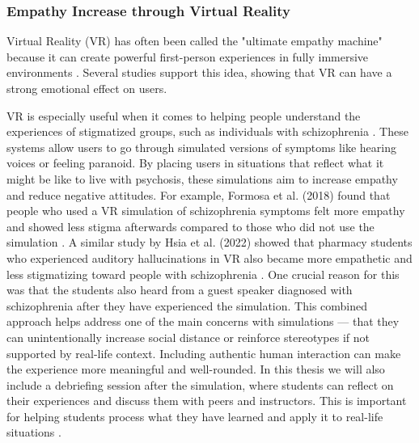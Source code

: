 \subsubsection{Empathy Increase through Virtual Reality}

Virtual Reality (VR) has often been called the "ultimate empathy machine" because it can create powerful first-person experiences in fully immersive environments \cite{Milk2015}. Several studies support this idea, showing that VR can have a strong emotional effect on users.

VR is especially useful when it comes to helping people understand the experiences of stigmatized groups, such as individuals with schizophrenia \cite{Formosa2018, Marques2022, Mattsson2024}. These systems allow users to go through simulated versions of symptoms like hearing voices or feeling paranoid. By placing users in situations that reflect what it might be like to live with psychosis, these simulations aim to increase empathy and reduce negative attitudes. For example, Formosa et al. (2018) found that people who used a VR simulation of schizophrenia symptoms felt more empathy and showed less stigma afterwards compared to those who did not use the simulation \cite{Formosa2018}. A similar study by Hsia et al. (2022) showed that pharmacy students who experienced auditory hallucinations in VR also became more empathetic and less stigmatizing toward people with schizophrenia \cite{Hsia2022}. One crucial reason for this was that the students also heard from a guest speaker diagnosed with schizophrenia after they have experienced the simulation. This combined approach helps address one of the main concerns with simulations — that they can unintentionally increase social distance or reinforce stereotypes if not supported by real-life context. Including authentic human interaction can make the experience more meaningful and well-rounded. In this thesis we will also include a debriefing session after the simulation, where students can reflect on their experiences and discuss them with peers and instructors. This is important for helping students process what they have learned and apply it to real-life situations \cite{Hsia2022}.

